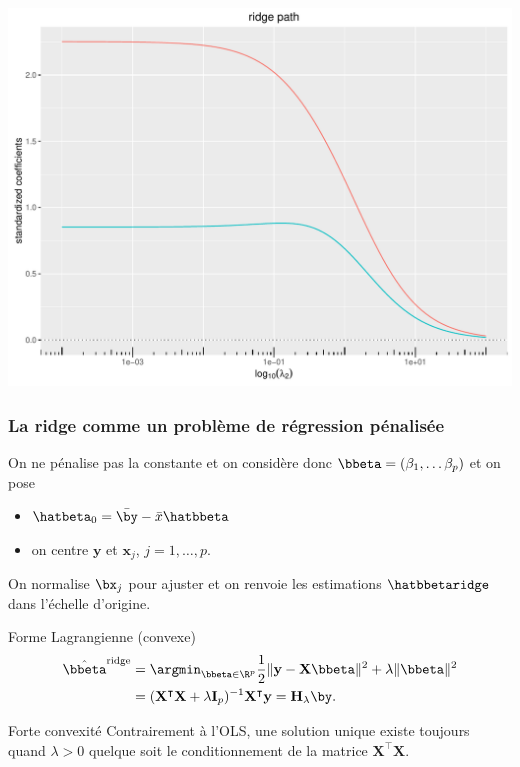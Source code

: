 \documentclass{beamer}\usepackage[]{graphicx}\usepackage[]{color}
\newenvironment{knitrout}{}{} %
\begin{document}
\begin{frame}
\begin{knitrout}
\includegraphics[width=\textwidth]{figures/toy_ridgeunnamed-chunk-43-2} 

\end{knitrout}

\end{frame}

\begin{frame}
  \frametitle{La ridge comme un problème de régression pénalisée}

  \alert{On ne pénalise pas la constante} et on considère donc  $\bbeta  =
  (\beta_1,\dots\beta_p)$ et on pose
  \begin{itemize}
  \item $\hatbeta_0 = \bar{\by} - \bar{x}\hatbbeta$
  \item on centre $\mathbf{y}$ et $\mathbf{x}_j$, $j=1,\dots,p$.
  \end{itemize}
  \alert{On normalise $\bx_j$} pour ajuster et on renvoie les estimations
  $\hatbbetaridge$ dans l'\alert{échelle d'origine}.

  \vfill

  \begin{block}{Forme Lagrangienne (convexe)}
    \vspace{-.5cm}
    \begin{align*}
      \hat{\bbeta}^{\text{ridge}} &  =   \argmin_{\bbeta\in\R^p}  \frac{1}{2}
      \|\mathbf{y} - \mathbf{X} \bbeta\|^2 + \lambda \|\bbeta\|^2\\
      & = (\mathbf{X}^\intercal \mathbf{X} +
      \lambda \mathbf{I}_p)^{-1} \mathbf{X}^\intercal \mathbf{y} = \mathbf{H}_\lambda \by.
    \end{align*}
  \end{block}

  \vfill

  \begin{block}{Forte convexité}
    Contrairement à l'OLS, une solution unique existe toujours quand    $\lambda>0$ quelque soit le conditionnement de la matrice
    $\mathbf{X}^\intercal \mathbf{X}$.
  \end{block}

\end{frame}
\end{document}
